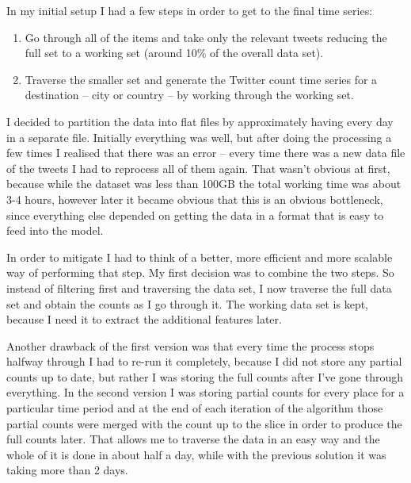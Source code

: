 \documentclass[minf,twoside,singlespacing,parskip,frontabs]{infthesis}
\begin{document}
In my initial setup I had a few steps in order to get to the final time series:
\begin{enumerate}
\item Go through all of the items and take only the relevant tweets reducing the full set to a working set (around 10\% of the overall data set).
\item Traverse the smaller set and generate the Twitter count time series for a destination -- city or country -- by working through the working set. 
\end{enumerate}

I decided to partition the data into flat files by approximately having every day in a separate file. Initially everything was well, but after doing the processing a few times I realised that there was an error -- every time there was a new data file of the tweets I had to reprocess all of them again. That wasn't obvious at first, because while the dataset was less than 100GB the total working time was about 3-4 hours, however later it became obvious that this is an obvious bottleneck, since everything else depended on getting the data in a format that is easy to feed into the model.

In order to mitigate I had to think of a better, more efficient and more scalable way of performing that step. My first decision was to combine the two steps. So instead of filtering first and traversing the data set, I now traverse the full data set and obtain the counts as I go through it. The working data set is kept, because I need it to extract the additional features later. 


Another drawback of the first version was that every time the process stops halfway through I had to re-run it completely, because I did not store any partial counts up to date, but rather I was storing the full counts after I've gone through everything. In the second version I was storing partial counts for every place for a particular time period and at the end of each iteration of the algorithm those partial counts were merged with the count up to the slice in order to produce the full counts later. That allows me to traverse the data in an easy way and the whole of it is done in about half a day, while with the previous solution it was taking more than 2 days.
\end{document}
